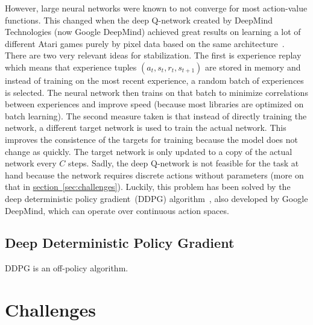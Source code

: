 \documentclass[a4paper,titlepage]{article}
\begin{document}
However, large neural networks were known to not converge for most action-value functions. This changed when the deep Q-network created by DeepMind Technologies (now Google DeepMind) achieved great results on learning a lot of different Atari games purely by pixel data based on the same architecture~\cite{nature}. There are two very relevant ideas for stabilization. The first is experience replay which means that experience tuples $(a_t, s_t, r_t, s_{t+1})$ are stored in memory and instead of training on the most recent experience, a random batch of experiences is selected. The neural network then trains on that batch to minimize correlations between experiences and improve speed (because most libraries are optimized on batch learning). The second measure taken is that instead of directly training the network, a different target network is used to train the actual network. This improves the consistence of the targets for training because the model does not change as quickly. The target network is only updated to a copy of the actual network every $C$ steps. Sadly, the deep Q-network is not feasible for the task at hand because the network requires discrete actions without parameters (more on that in \hyperref[sec:challenges]{section~\ref*{sec:challenges}}). Luckily, this problem has been solved by the deep deterministic policy gradient~(DDPG) algorithm~\cite{ddpg}, also developed by Google DeepMind, which can operate over continuous action spaces.

\subsection{Deep Deterministic Policy Gradient}

DDPG is an off-policy algorithm. 

\newpage

\section{Challenges}
\end{document}
